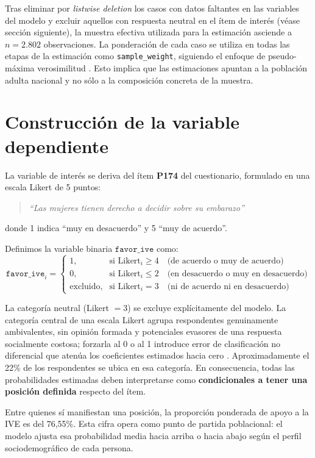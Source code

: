 \documentclass[11pt,a4paper]{article}
\begin{document}
Tras eliminar por \emph{listwise deletion} los casos con datos faltantes en las variables del modelo y excluir aquellos con respuesta neutral en el ítem de interés (véase sección siguiente), la muestra efectiva utilizada para la estimación asciende a $n = 2.802$ observaciones. La ponderación de cada caso se utiliza en todas las etapas de la estimación como \texttt{sample\_weight}, siguiendo el enfoque de pseudo-máxima verosimilitud \cite{Pfeffermann1993,Binder1983}. Esto implica que las estimaciones apuntan a la población adulta nacional y no sólo a la composición concreta de la muestra.

\section{Construcción de la variable dependiente}

La variable de interés se deriva del ítem \textbf{P174} del cuestionario, formulado en una escala Likert de 5 puntos:
\begin{quote}
\textit{``Las mujeres tienen derecho a decidir sobre su embarazo''}
\end{quote}
donde 1 indica ``muy en desacuerdo'' y 5 ``muy de acuerdo''.

Definimos la variable binaria $\texttt{favor\_ive}$ como:
\begin{equation}
\texttt{favor\_ive}_i =
\begin{cases}
1, & \text{si Likert}_i \geq 4 \quad \text{(de acuerdo o muy de acuerdo)} \\
0, & \text{si Likert}_i \leq 2 \quad \text{(en desacuerdo o muy en desacuerdo)} \\
\text{excluido}, & \text{si Likert}_i = 3 \quad \text{(ni de acuerdo ni en desacuerdo)}
\end{cases}
\end{equation}

La categoría neutral (Likert $= 3$) se excluye explícitamente del modelo. La categoría central de una escala Likert agrupa respondentes genuinamente ambivalentes, sin opinión formada y potenciales evasores de una respuesta socialmente costosa; forzarla al 0 o al 1 introduce error de clasificación no diferencial que atenúa los coeficientes estimados hacia cero \cite{Jacoby1994}. Aproximadamente el 22\% de los respondentes se ubica en esa categoría. En consecuencia, todas las probabilidades estimadas deben interpretarse como \textbf{condicionales a tener una posición definida} respecto del ítem.

Entre quienes sí manifiestan una posición, la proporción ponderada de apoyo a la IVE es del 76,55\%. Esta cifra opera como punto de partida poblacional: el modelo ajusta esa probabilidad media hacia arriba o hacia abajo según el perfil sociodemográfico de cada persona.
\end{document}
